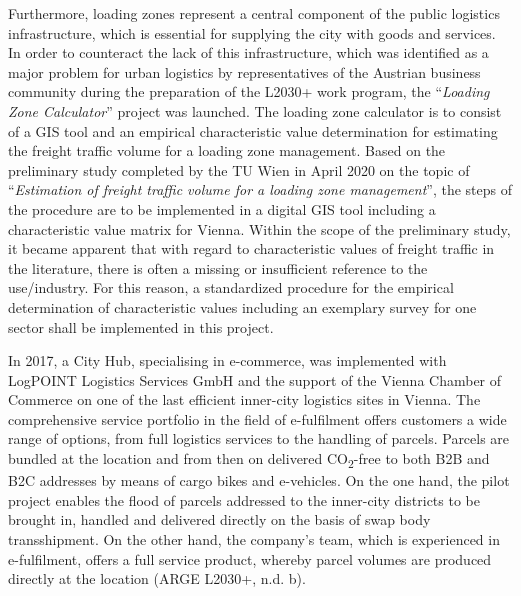 \documentclass[
]{book}
\begin{document}
Furthermore, loading zones represent a central component of the public logistics infrastructure, which is essential for supplying the city with goods and services. In order to counteract the lack of this infrastructure, which was identified as a major problem for urban logistics by representatives of the Austrian business community during the preparation of the L2030+ work program, the ``\emph{Loading Zone Calculator}'' project was launched. The loading zone calculator is to consist of a GIS tool and an empirical characteristic value determination for estimating the freight traffic volume for a loading zone management. Based on the preliminary study completed by the TU Wien in April 2020 on the topic of ``\emph{Estimation of freight traffic volume for a loading zone management}'', the steps of the procedure are to be implemented in a digital GIS tool including a characteristic value matrix for Vienna. Within the scope of the preliminary study, it became apparent that with regard to characteristic values of freight traffic in the literature, there is often a missing or insufficient reference to the use/industry. For this reason, a standardized procedure for the empirical determination of characteristic values including an exemplary survey for one sector shall be implemented in this project.

In 2017, a City Hub, specialising in e-commerce, was implemented with LogPOINT Logistics Services GmbH and the support of the Vienna Chamber of Commerce on one of the last efficient inner-city logistics sites in Vienna. The comprehensive service portfolio in the field of e-fulfilment offers customers a wide range of options, from full logistics services to the handling of parcels. Parcels are bundled at the location and from then on delivered CO\textsubscript{2}-free to both B2B and B2C addresses by means of cargo bikes and e-vehicles. On the one hand, the pilot project enables the flood of parcels addressed to the inner-city districts to be brought in, handled and delivered directly on the basis of swap body transshipment. On the other hand, the company's team, which is experienced in e-fulfilment, offers a full service product, whereby parcel volumes are produced directly at the location (ARGE L2030+, n.d. b).
\end{document}
